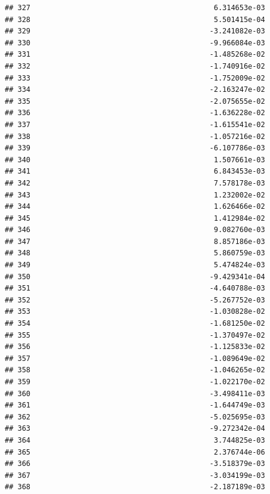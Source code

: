 \documentclass[
]{article}
\begin{document}
\begin{verbatim}
## 327                                           6.314653e-03
## 328                                           5.501415e-04
## 329                                          -3.241082e-03
## 330                                          -9.966084e-03
## 331                                          -1.485268e-02
## 332                                          -1.740916e-02
## 333                                          -1.752009e-02
## 334                                          -2.163247e-02
## 335                                          -2.075655e-02
## 336                                          -1.636228e-02
## 337                                          -1.615541e-02
## 338                                          -1.057216e-02
## 339                                          -6.107786e-03
## 340                                           1.507661e-03
## 341                                           6.843453e-03
## 342                                           7.578178e-03
## 343                                           1.232002e-02
## 344                                           1.626466e-02
## 345                                           1.412984e-02
## 346                                           9.082760e-03
## 347                                           8.857186e-03
## 348                                           5.860759e-03
## 349                                           5.474824e-03
## 350                                          -9.429341e-04
## 351                                          -4.640788e-03
## 352                                          -5.267752e-03
## 353                                          -1.030828e-02
## 354                                          -1.681250e-02
## 355                                          -1.370497e-02
## 356                                          -1.125833e-02
## 357                                          -1.089649e-02
## 358                                          -1.046265e-02
## 359                                          -1.022170e-02
## 360                                          -3.498411e-03
## 361                                          -1.644749e-03
## 362                                          -5.025695e-03
## 363                                          -9.272342e-04
## 364                                           3.744825e-03
## 365                                           2.376744e-06
## 366                                          -3.518379e-03
## 367                                          -3.034199e-03
## 368                                          -2.187189e-03

\end{verbatim}
\end{document}
